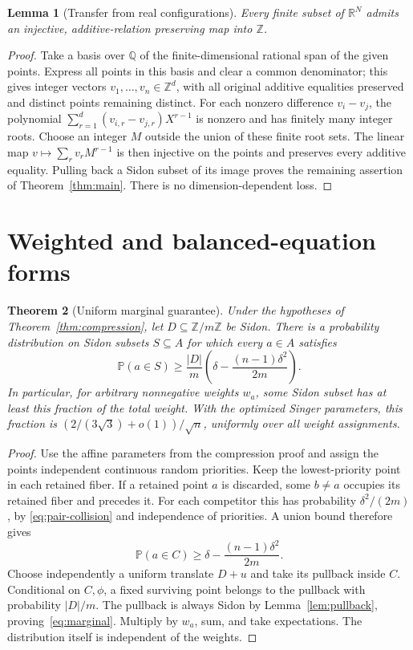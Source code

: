 \documentclass[11pt]{article}
\newtheorem{theorem}{Theorem}[section]
\newtheorem{lemma}[theorem]{Lemma}
\theoremstyle{definition}
\theoremstyle{remark}
\newcommand{\Z}{\mathbb Z}
\newcommand{\R}{\mathbb R}
\newcommand{\Q}{\mathbb Q}
\newcommand{\Prob}{\mathbb P}
\begin{document}
\begin{lemma}[Transfer from real configurations]\label{lem:real}
Every finite subset of $\R^N$ admits an injective, additive-relation
preserving map into $\Z$.
\end{lemma}
\begin{proof}
Take a basis over $\Q$ of the finite-dimensional rational span of the
given points. Express all points in this basis and clear a common
denominator; this gives integer vectors $v_1,\ldots,v_n\in\Z^d$,
with all original additive equalities preserved and distinct points
remaining distinct. For each nonzero difference $v_i-v_j$, the polynomial
$\sum_{r=1}^d(v_{i,r}-v_{j,r})X^{r-1}$ is nonzero and has finitely many
integer roots. Choose an integer $M$ outside the union of these finite
root sets. The linear map $v\mapsto\sum_r v_rM^{r-1}$ is then injective
on the points and preserves every additive equality. Pulling back a
Sidon subset of its image proves the remaining assertion of
Theorem~\ref{thm:main}. There is no dimension-dependent loss.
\end{proof}

\section{Weighted and balanced-equation forms}

\begin{theorem}[Uniform marginal guarantee]\label{thm:weighted}
Under the hypotheses of Theorem~\ref{thm:compression}, let
$D\subseteq\Z/m\Z$ be Sidon. There is a probability distribution on
Sidon subsets $S\subseteq A$ for which every $a\in A$ satisfies
\begin{equation}\label{eq:marginal}
\Prob(a\in S)\ge\frac{|D|}{m}
\left(\delta-\frac{(n-1)\delta^2}{2m}\right).
\end{equation}
In particular, for arbitrary nonnegative weights $w_a$, some Sidon
subset has at least this fraction of the total weight. With the
optimized Singer parameters, this fraction is
$(2/(3\sqrt3)+o(1))/\sqrt n$, uniformly over all weight assignments.
\end{theorem}
\begin{proof}
Use the affine parameters from the compression proof and assign the
points independent continuous random priorities. Keep the lowest-priority
point in each retained fiber. If a retained point $a$ is discarded,
some $b\ne a$ occupies its retained fiber and precedes it. For each
competitor this has probability $\delta^2/(2m)$, by
\eqref{eq:pair-collision} and independence of priorities. A union bound
therefore gives
\[
\Prob(a\in C)\ge\delta-\frac{(n-1)\delta^2}{2m}.
\]
Choose independently a uniform translate $D+u$ and take its pullback
inside $C$. Conditional on $C,\phi$, a fixed surviving point belongs
to the pullback with probability $|D|/m$. The pullback is always Sidon
by Lemma~\ref{lem:pullback}, proving~\eqref{eq:marginal}. Multiply by
$w_a$, sum, and take expectations. The distribution itself is independent
of the weights.
\end{proof}
\end{document}
